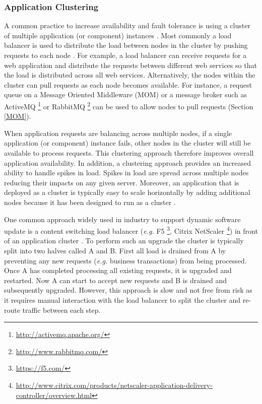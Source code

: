 \documentclass[a4paper,11pt,twoside]{article}
\begin{document}
\subsubsection{Application Clustering}
A common practice to increase availability and fault tolerance is using a cluster of multiple application (or component) instances \cite{Clustring}. Most commonly a load balancer is used to distribute the load between nodes in the cluster by pushing requests to each node \cite{balancer}. For example, a load balancer can receive requests for a web application and distribute the requests between different web services so that the load is distributed across all web services. Alternatively, the nodes within the cluster can pull requests as each node becomes available. For instance, a request queue on a Message Oriented Middleware (MOM) or a message broker such as ActiveMQ \footnote{ \url{http://activemq.apache.org/}} or RabbitMQ \footnote{ \url{http://www.rabbitmq.com/}} can be used to allow nodes to pull requests (Section \ref{MOM}).

When application requests are balancing across multiple nodes, if a single application (or component) instance fails, other nodes in the cluster will still be available to process requests. This clustering approach therefore improves overall application availability. In addition, a clustering approach provides an increased ability to handle spikes in load. Spikes in load are spread across multiple nodes reducing their impacts on any given server. Moreover, an application that is deployed as a cluster is typically easy to scale horizontally by adding additional nodes because it has been designed to run as a cluster \cite{Clustring}.

One common approach widely used in industry to support dynamic software update is a content switching load balancer (\textit{e.g.} F5 \footnote{\url{https://f5.com/}}, Citrix  NetScaler \footnote{\url{http://www.citrix.com/products/netscaler-application-delivery-controller/overview.html}}) in front of an application cluster \cite{balancer}. To perform such an upgrade the cluster is typically split into two halves called A and B. First all load is drained from A by preventing any new requests (\textit{e.g.} business transactions) from being processed. Once A has completed processing all existing requests, it is upgraded and restarted. Now A can start to accept new requests and B is drained and subsequently upgraded. However, this approach is slow and not free from risk as it requires manual interaction with the load balancer to split the cluster and re-route traffic between each step.
\end{document}
